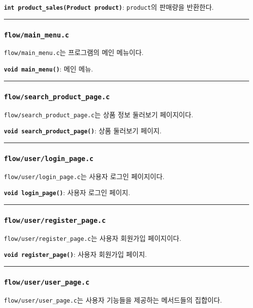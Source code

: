 \documentclass[runningheads]{llncs}
\begin{document}
\textbf{\texttt{int product_sales(Product product)}}: \texttt{product}의 판매량을 반환한다.

\noindent\rule{2cm}{0.4pt}

\subsubsection{\texttt{flow/main_menu.c}}
\texttt{flow/main_menu.c}는 프로그램의 메인 메뉴이다.

\textbf{\texttt{void main_menu()}}: 메인 메뉴.

\noindent\rule{2cm}{0.4pt}

\subsubsection{\texttt{flow/search_product_page.c}}
\texttt{flow/search_product_page.c}는 상품 정보 둘러보기 페이지이다.

\textbf{\texttt{void search_product_page()}}: 상품 둘러보기 페이지.

\noindent\rule{2cm}{0.4pt}

\subsubsection{\texttt{flow/user/login_page.c}}
\texttt{flow/user/login_page.c}는 사용자 로그인 페이지이다.

\textbf{\texttt{void login_page()}}: 사용자 로그인 페이지.

\noindent\rule{2cm}{0.4pt}

\subsubsection{\texttt{flow/user/register_page.c}}
\texttt{flow/user/register_page.c}는 사용자 회원가입 페이지이다.

\textbf{\texttt{void register_page()}}: 사용자 회원가입 페이지.

\noindent\rule{2cm}{0.4pt}

\subsubsection{\texttt{flow/user/user_page.c}}
\texttt{flow/user/user_page.c}는 사용자 기능들을 제공하는 메서드들의 집합이다.
\end{document}
